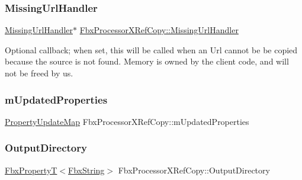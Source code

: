 \subsubsection{\texorpdfstring{Missing\+Url\+Handler}{MissingUrlHandler}}
{\footnotesize\ttfamily \hyperlink{class_fbx_processor_x_ref_copy_1_1_missing_url_handler}{Missing\+Url\+Handler}$\ast$ \hyperlink{class_fbx_processor_x_ref_copy_1_1_missing_url_handler}{Fbx\+Processor\+X\+Ref\+Copy\+::\+Missing\+Url\+Handler}}

Optional callback; when set, this will be called when an Url cannot be be copied because the source is not found. Memory is owned by the client code, and will not be freed by us. \mbox{\label{class_fbx_processor_x_ref_copy_ac42ed09834ba503d47e328d8c9734131}} 
\subsubsection{\texorpdfstring{m\+Updated\+Properties}{mUpdatedProperties}}
{\footnotesize\ttfamily \hyperlink{class_fbx_processor_x_ref_copy_af0408f51b60aa6c9fb8aab6e73f57eb7}{Property\+Update\+Map} Fbx\+Processor\+X\+Ref\+Copy\+::m\+Updated\+Properties\hspace{0.3cm}{\ttfamily [protected]}}

\mbox{\label{class_fbx_processor_x_ref_copy_ae6b30eabb327bb56e3e2cf5b7b829e29}} 
\subsubsection{\texorpdfstring{Output\+Directory}{OutputDirectory}}
{\footnotesize\ttfamily \hyperlink{class_fbx_property_t}{Fbx\+PropertyT}$<$\hyperlink{class_fbx_string}{Fbx\+String}$>$ Fbx\+Processor\+X\+Ref\+Copy\+::\+Output\+Directory}

\mbox{\label{class_fbx_processor_x_ref_copy_a0b9debffb0e6257ae9cbeec846ca72d0}} 
